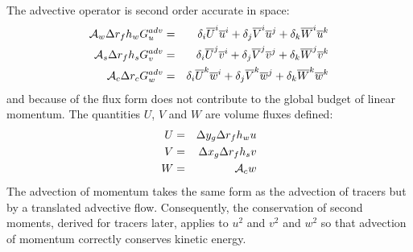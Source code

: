 The advective operator is second order accurate in space:
\begin{eqnarray}
{\cal A}_w \Delta r_f h_w G_u^{adv} & = &
  \delta_i \overline{ U }^i \overline{ u }^i
+ \delta_j \overline{ V }^i \overline{ u }^j
+ \delta_k \overline{ W }^i \overline{ u }^k \label{eq:discrete-momadvu} \\
{\cal A}_s \Delta r_f h_s G_v^{adv} & = &
  \delta_i \overline{ U }^j \overline{ v }^i
+ \delta_j \overline{ V }^j \overline{ v }^j
+ \delta_k \overline{ W }^j \overline{ v }^k \label{eq:discrete-momadvv} \\
{\cal A}_c \Delta r_c G_w^{adv} & = &
  \delta_i \overline{ U }^k \overline{ w }^i
+ \delta_j \overline{ V }^k \overline{ w }^j
+ \delta_k \overline{ W }^k \overline{ w }^k \label{eq:discrete-momadvw}
\end{eqnarray}
and because of the flux form does not contribute to the global budget
of linear momentum. The quantities $U$, $V$ and $W$ are volume fluxes
defined:
\begin{eqnarray}
U & = & \Delta y_g \Delta r_f h_w u \label{eq:utrans} \\
V & = & \Delta x_g \Delta r_f h_s v \label{eq:vtrans} \\
W & = & {\cal A}_c w \label{eq:rtrans}
\end{eqnarray}
The advection of momentum takes the same form as the advection of
tracers but by a translated advective flow. Consequently, the
conservation of second moments, derived for tracers later, applies to
$u^2$ and $v^2$ and $w^2$ so that advection of momentum correctly
conserves kinetic energy.




